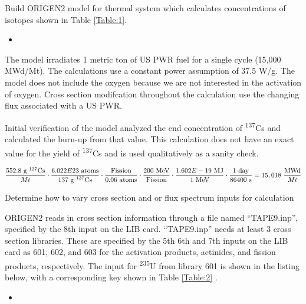 \documentclass[11pt,notitlepage]{article}
\newcommand{\tss}{\textsuperscript}
\newcommand{\inputdeck}[2]{
\begin{itemize}
\item[]
\end{itemize}
}
\newcommand{\inputdeckpages}[4]{
\begin{itemize}
\item[]
\end{itemize}
}
\newcommand{\cmark}{\ding{51}}%
\newcommand{\done}{\rlap{$\square$}{\raisebox{2pt}{\large\hspace{1pt}\cmark}}%
  \hspace{-2.5pt}}
\begin{document}
\begin{todolist}
\item[\done]{Build ORIGEN2 model for thermal system which
  calculates concentrations of isotopes shown in
  Table \ref{Table:1}.}

  \inputdeck{../Origen2/TAPE5}{PWR Input Deck}

  The model irradiates 1 metric ton of US PWR fuel for a single
  cycle (15,000 MWd/Mt). The calculations use a constant power assumption
  of 37.5 W/g. The model does not include the oxygen because
  we are not interested in the activation of oxygen.
  Cross section modifcation throughout the calculation
  use the changing flux associated with a US PWR. 

  Initial verification of the model analyzed the end concentration of
  \tss{137}Cs and calculated the burn-up from that value. This calculation
  does not have an exact value for the yield of \tss{137}Cs and is
  used qualitatively as a sanity check.

  \begin{equation*}
    \frac{552.8\ \text{g \tss{137}Cs}}{Mt}\cdot
    \frac{6.022E23\ \text{atoms}}{137\ \text{g \tss{137}Cs}}\cdot
    \frac{\text{Fission}}{0.06\ \text{atoms}}\cdot
    \frac{200\ \text{MeV}}{\text{Fission}}\cdot
    \frac{1.602E-19\ \text{MJ}}{1\ \text{MeV}}\cdot
    \frac{1\ \text{day}}{86400\ \text{s}}=15,018\ \frac{\text{MWd}}{Mt}
  \end{equation*}

\item[\done]{Determine how to vary cross section and or flux spectrum
  inputs for calculation}
  
  ORIGEN2 reads in cross section information through a file
  named ``TAPE9.inp'', specified by the 8th input on the LIB card.
  ``TAPE9.inp'' needs at least 3 cross section libraries. These
  are specified by the 5th 6th and 7th inputs on the LIB card as
  601, 602, and 603 for the activation products, actinides, and
  fission products, respectively. The input for \tss{235}U
  from library 601 is shown in the listing below, with
  a corresponding key shown in Table \ref{Table:2} \cite{croff1980user}.
  
  \inputdeckpages{../Origen2/TAPE9_BANK}{\tss{235}U cross section
    library 602 input}{3827}{3827}


\end{todolist}
\end{document}
